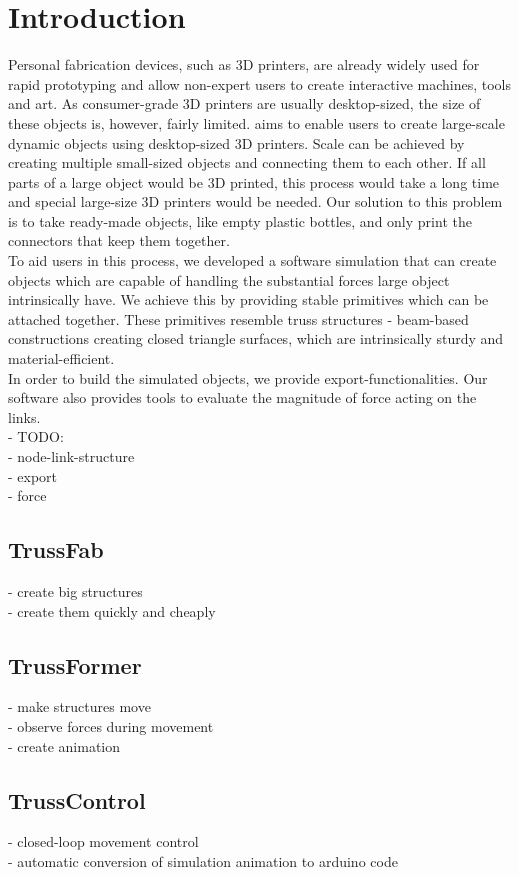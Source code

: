 \chapter{Introduction}\label{ch:introduction}
Personal fabrication devices, such as 3D printers, are already widely used for rapid prototyping and allow non-expert users to create interactive machines, tools and art. As consumer-grade 3D printers are usually desktop-sized, the size of these objects is, however, fairly limited. \trussFabName{} aims to enable users to create large-scale dynamic objects using desktop-sized 3D printers. Scale can be achieved by creating multiple small-sized objects and connecting them to each other. If all parts of a large object would be 3D printed, this process would take a long time and special large-size 3D printers would be needed. Our solution to this problem is to take ready-made objects, like empty plastic bottles, and only print the connectors that keep them together.\\
To aid users in this process, we developed a software simulation that can create objects which are capable of handling the substantial forces large object intrinsically have. We achieve this by providing stable primitives which can be attached together. These primitives resemble truss structures - beam-based constructions creating closed triangle surfaces, which are intrinsically sturdy and material-efficient.\\
In order to build the simulated objects, we provide export-functionalities.
Our software also provides tools to evaluate the magnitude of force acting on the links.\\
- TODO:\\
- node-link-structure\\
- export\\
- force\\
\section{TrussFab}
- create big structures\\
- create them quickly and cheaply\\
\section{TrussFormer}
- make structures move\\
- observe forces during movement\\
- create animation\\
\section{TrussControl}
- closed-loop movement control\\
- automatic conversion of simulation animation to arduino code\\
